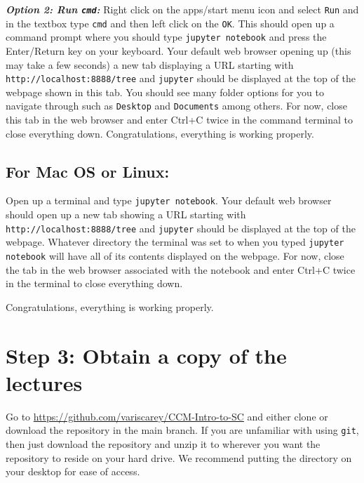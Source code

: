 \documentclass{amsart}
\theoremstyle{plain}
\theoremstyle{definition}
\theoremstyle{remark}
\theoremstyle{definition}
\numberwithin{equation}{section}
\numberwithin{equation}{section}
\begin{document}
{\bf \em Option 2: Run \verb|cmd|:}
Right click on the apps/start menu icon and select \verb|Run| and in the textbox type \verb|cmd| and then left click on the \verb|OK|. 
This should open up a command prompt where you should type \verb|jupyter notebook| and press the Enter/Return key on your keyboard. 
Your default web browser opening up (this may take a few seconds) a new tab displaying a URL starting with \verb|http://localhost:8888/tree| and \verb|jupyter| should be displayed at the top of the webpage shown in this tab. 
You should see many folder options for you to navigate through such as \verb|Desktop| and \verb|Documents| among others. 
For now, close this tab in the web browser and enter Ctrl+C twice in the command terminal to close everything down.
Congratulations, everything is working properly. 

\subsection*{For Mac OS or Linux:}

Open up a terminal and type \verb|jupyter notebook|. 
Your default web browser should open up a new tab showing a URL starting with \verb|http://localhost:8888/tree| and \verb|jupyter| should be displayed at the top of the webpage. 
Whatever directory the terminal was set to when you typed \verb|jupyter notebook| will have all of its contents displayed on the webpage. 
For now, close the tab in the web browser associated with the notebook and enter Ctrl+C twice in the terminal to close everything down.

Congratulations, everything is working properly. 

\section*{Step 3: Obtain a copy of the lectures}

Go to \href{https://github.com/variscarey/CCM-Intro-to-SC}{https://github.com/variscarey/CCM-Intro-to-SC} and either clone or download the repository in the main branch.
If you are unfamiliar with using \verb|git|, then just download the repository and unzip it to wherever you want the repository to reside on your hard drive. 
We recommend putting the directory on your desktop for ease of access. 
\end{document}

